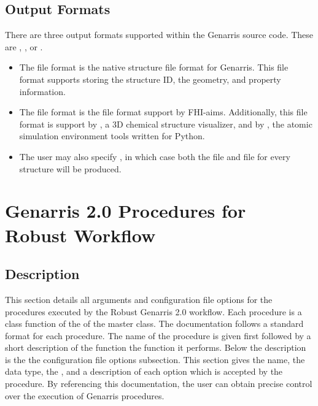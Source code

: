 \documentclass[letterpaper,10pt,english]{sphinxmanual}
\begin{document}
\section{Output Formats}
\label{\detokenize{index:output-formats}}
There are three output formats supported within the Genarris source code. These
are , , or .
\begin{itemize}
\item {} 
The  file format is the native structure file format for Genarris.
This file format supports storing the structure ID, the geometry, and
property information.

\item {} 
The  file format is the file format support by FHI-aims. Additionally,
this file format is support by  , a 3D chemical structure visualizer,
and by , the atomic simulation environment tools written for Python.

\item {} 
The user may also specify , in which case both the  file
and  file for every structure will be produced.

\end{itemize}


\chapter{Genarris 2.0 Procedures for Robust Workflow}
\label{\detokenize{index:genarris-2-0-procedures-for-robust-workflow}}

\section{Description}
\label{\detokenize{index:description}}
This section details all arguments and configuration file
options for the procedures executed by the Robust Genarris 2.0 workflow. Each
procedure is a class function of the of the  master class.
The documentation follows a standard format for each procedure. The name
of the procedure is given first followed by a short description of the function
the function it performs. Below the description is the the configuration file
options subsection. This section gives the name, the data type,
the {\hyperref[\detokenize{index:category}]{}}, and a description of each option which is accepted by the
procedure. By referencing this documentation, the user can obtain precise
control over the execution of Genarris procedures.
\end{document}
